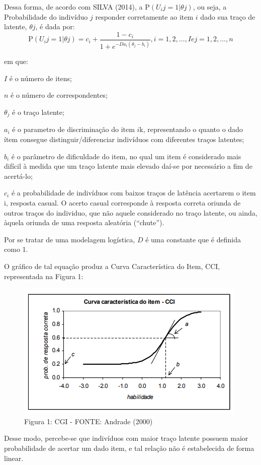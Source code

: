 \documentclass{article}
\begin{document}
Dessa forma, de acordo com SILVA (2014), a $\text{P}(U_ij=1|\theta j)$, ou seja, a Probabilidade do indivíduo $j$ responder corretamente ao item $i$ dado sua traço de latente, $\theta j$, é dada por:
\[\text{P}(U_ij=1|\theta j)=c_i+\frac{1-c_i}{1+e^{-Da_i(\theta_j - b_i)}}, i={1, 2, \dots, I} e j={1, 2, \dots, n}\]

em que:

$I$ é o número de itens;

$n$ é o número de correspondentes;

$\theta_j$ é o traço latente;

$a_i$ é o parametro de discriminação do item $i$k, representando o quanto o dado ítem consegue distinguir/diferenciar indivíduos com diferentes traços latentes; 

$b_i$ é o parâmetro de dificuldade do item, no qual um item é considerado mais difícil à medida que um traço latente mais elevado daí-se por necessário a fim de acertá-lo;

$c_i$ é a probabilidade de indivíduos com baixos traços de latência acertarem o item i, resposta casual. O acerto casual corresponde à resposta correta oriunda de outros traços do individuo, que não aquele considerado no traço latente, ou ainda, àquela oriunda de uma resposta aleatória (“chute”).

Por se tratar de uma modelagem logística, $D$ é uma constante que é definida como 1.

O gráfico de tal equação produz a Curva Característica do Item, CCI, representada na Figura 1:

\begin{figure}[h]
    \centering
    \includegraphics{images/cgi.png}
    \caption{Figura 1: CGI - FONTE: Andrade (2000)}
    \label{fig:CGI}
\end{figure}

Desse modo, percebe-se que indivíduos com maior traço latente possuem maior probabilidade de acertar um dado item, e tal relação não é estabelecida de forma linear.
\end{document}
